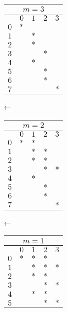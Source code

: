 \documentclass{jsarticle}
\begin{document}
\begin{center}
  \begin{tabular}{|l|c|c|c|c|}\hline
    \multicolumn{5}{|c|}{$m=3$} \\\hline
        & $0$ & $1$ & $2$ & $3$ \\\hline
    $0$ & $*$ &     &     &     \\\hline
    $1$ &     & $*$ &     &     \\\hline
    $2$ &     & $*$ &     &     \\\hline
    $3$ &     &     & $*$ &     \\\hline
    $4$ &     & $*$ &     &     \\\hline
    $5$ &     &     & $*$ &     \\\hline
    $6$ &     &     & $*$ &     \\\hline
    $7$ &     &     &     & $*$ \\\hline
  \end{tabular}
  ←\
  \begin{tabular}{|l|c|c|c|c|}\hline
    \multicolumn{5}{|c|}{$m=2$} \\\hline
        & $0$ & $1$ & $2$ & $3$ \\\hline
    $0$ & $*$ & $*$ &     &     \\\hline
    $1$ &     & $*$ & $*$ &     \\\hline
    $2$ &     & $*$ & $*$ &     \\\hline
    $3$ &     &     & $*$ & $*$ \\\hline
    $4$ &     & $*$ &     &     \\\hline
    $5$ &     &     & $*$ &     \\\hline
    $6$ &     &     & $*$ &     \\\hline
    $7$ &     &     &     & $*$ \\\hline
  \end{tabular}
  ←\
  \begin{tabular}{|l|c|c|c|c|}\hline
    \multicolumn{5}{|c|}{$m=1$} \\\hline
        & $0$ & $1$ & $2$ & $3$ \\\hline
    $0$ & $*$ & $*$ & $*$ &     \\\hline
    $1$ &     & $*$ & $*$ & $*$ \\\hline
    $2$ &     & $*$ & $*$ &     \\\hline
    $3$ &     &     & $*$ & $*$ \\\hline
    $4$ &     & $*$ & $*$ &     \\\hline
    $5$ &     &     & $*$ & $*$ \\\hline

\end{tabular}
\end{center}
\end{document}
